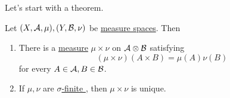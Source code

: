Let's start with a theorem.
\begin{theorem}
	Let \((X, \mathcal{\MakeUppercase{a}} , \mu ), (Y, \mathcal{\MakeUppercase{b}} , \nu )\) be \hyperref[def:measure-space]{measure spaces}. Then
	\begin{enumerate}[(1)]
		\item There is a \hyperref[def:measure]{measure} \(\mu \times \nu \) on \(\mathcal{\MakeUppercase{a}} \otimes \mathcal{\MakeUppercase{b}} \) satisfying
		      \[
			      (\mu \times \nu )(A\times B) = \mu (A)\nu (B)
		      \]
		      for every \(A\in \mathcal{\MakeUppercase{a}} , B\in \mathcal{\MakeUppercase{b}} \).
		\item If \(\mu , \nu \) are \hyperref[def:sigma-finite-measure]{\(\sigma\)-finite }, then \(\mu \times \nu \) is unique.
	\end{enumerate}
\end{theorem}
